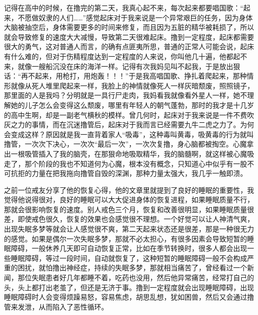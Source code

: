 记得在高中的时候，在撸完的第二天，我真心起不来，每次起来都要唱国歌：“起来，不愿做奴隶的人们……”感觉起床对于我来说是一个异常艰巨的任务，因为身体大脑被抽空后，身体需要更多的时间来修复，而且因为五脏的精华被耗损了，所以就会导致修复的速度大大减慢，导致第二天很难起床。撸到一定程度，起床都需要很大的勇气，这对普通人而言，的确有点匪夷所思，普通的正常人可能会说，起床有什么难的，但对于伤精程度达到一定程度的人来说，你叫他几十遍，他都起不来，就像一艘船沉没在床的海洋一样。记得有次我妈见叫不起我，于是放出狠话：“再不起来，用枪打，用炮轰！！！”于是我高唱国歌、挣扎着爬起来，那种情形就像从死人堆里爬起来一样，我脸上的神情就像死人一样灰暗颓废，照照镜子，那里面的人是我吗？分明就是一具行尸走肉，我妈看我就像看外星人一样，她不理解她的儿子怎么会变得这么颓废，哪里有年轻人的朝气蓬勃，那时的我才是十几岁的高中生啊，却是一副老气横秋的模样。曾几何时，起床对于我来说是一件不费吹灰之力的事情，而在沉迷撸管后，起床对于我而言已经需要九牛二虎之力了。为何会变成这样？原因就是我一直背着家人“吸毒”，这种毒叫黄毒，吸黄毒的行为就叫撸管，一次次下决心，一次次“最后一次”，一次次复撸，身心脑都被掏空。心魔拿出一根吸管插入了我的脑壳，在那狠命地吸取精华，我的脑髓啊，就这样被心魔吸走了，那个阶段的我也不知道何为心魔，根本没有概念，只知道心中似乎有一股不可抗拒的力量在把我拖向撸管自毁的深渊，那种力量太强大，我几乎一触即溃。

之前一位戒友分享了他的恢复心得，他的文章里就提到了良好的睡眠的重要性，我觉得他说得很对，良好的睡眠可以大大促进身体的恢复进程，如果睡眠质量不行，那就会很影响恢复的速度。别人戒色三个月，恢复和改善很明显，如果睡眠质量很差，即使戒色很久，恢复的效果也会感觉很不理想。一个好觉可以让人神清气爽，出现失眠多梦等就会让人感觉很不爽，第二天起来状态还是很差，那是一种很无力的感觉。如果是偶尔一次失眠多梦，那就不必太担心，有很多因素会导致短暂的睡眠障碍，一般休养几天即可自动恢复正常，比如在季节转换时，很多人都会出现一些睡眠障碍，等过一段时间，自动就恢复了，这种短暂的睡眠障碍一般不会构成严重的困扰，就怕撸出神经症，持续的失眠多梦，那就相当痛苦了，曾经看过一个新闻，那位失眠患者好几年都睡不着，吃药也没用，然后他异常痛苦，经常打自己的头，头上都打出老茧了，但还是无济于事。撸到一定程度就会出现睡眠障碍，出现睡眠障碍时人会变得烦躁易怒，容易焦虑，胡思乱想，犹如困兽，然后又会通过撸管来发泄，从而陷入了恶性循环。


